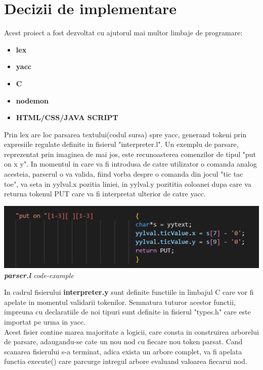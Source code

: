 \documentclass{article}
\begin{document}
\section{Decizii de implementare}
Acest proiect a fost dezvoltat cu ajutorul mai multor limbaje de programare:
\begin{itemize}
\item \textbf{lex} 
\item \textbf{yacc}
\item \textbf{C}
\item \textbf{nodemon}
\item \textbf{HTML/CSS/JAVA SCRIPT} 
\end{itemize}

Prin lex are loc parsarea textului(codul sursa) spre yacc, generand tokeni prin expresiile regulate definite in fisierul "interpreter.l". Un exemplu de parsare, reprezentat prin imaginea de mai jos, este recunoasterea comenzilor de tipul "put on x y". In momentul in care va fi introdusa de catre utilizator o comanda analog acesteia, parserul o va valida, fiind vorba despre o comanda din jocul "tic tac toe", va seta in yylval.x pozitia liniei, in yylval.y pozititia coloanei dupa care va returna tokenul PUT care va fi interpretat ulterior de catre yacc. \\

\begin{center}
\includegraphics[scale = 0.4]{lex_example.png}\\
\textit{\textbf{parser.l} code-example}
\end{center}

In cadrul fisierului \textbf{interpreter.y} sunt definite functiile in limbajul C care vor fi apelate in momentul validarii tokenilor. Semnatura tuturor acestor functii, impreuna cu declaratiile de noi tipuri sunt definite in fisierul "types.h" care este importat pe urma in yacc. \\

Acest fisier contine marea majoritate a logicii, care consta in construirea arborelui de parsare, adaugandu-se cate un nou nod cu fiecare nou token parsat. Cand scanarea fisierului s-a terminat, adica exista un arbore complet, va fi apelata functia execute() care parcurge intregul arbore evaluand valoarea fiecarui nod. \\
\end{document}
